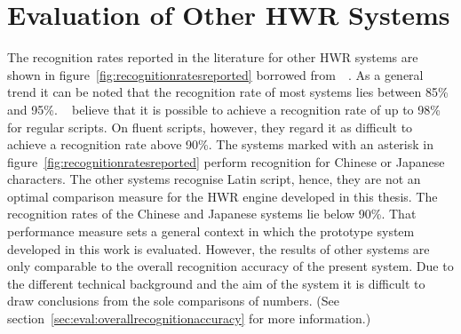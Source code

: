 


\section{Evaluation of Other HWR Systems}
\label{sec:eval:othersystems}

The recognition rates reported in the literature for other HWR systems are 
shown in figure~\ref{fig:recognitionratesreported} borrowed 
from~~\citeyear{LiuJaegerNakagawa2004}.
As a general trend it can be noted that the recognition rate of most systems
lies between 85\% and 95\%. 
~\citeyear{LiuJaegerNakagawa2004}
believe that it is possible to achieve a recognition rate of up to 98\% 
for regular scripts. On fluent scripts, however, they regard it as difficult 
to achieve a recognition rate above 90\%.
The systems marked with an asterisk in figure~\ref{fig:recognitionratesreported}
perform recognition for Chinese or Japanese characters. 
The other systems recognise Latin script, hence, they are not an optimal
comparison measure for the HWR engine developed in this thesis.
The recognition rates of the Chinese and Japanese systems lie below 90\%. 
That performance measure sets a general context in which 
the prototype system developed in this work is evaluated.
However, the results of other systems are only comparable to the overall 
recognition accuracy of the present system. Due to the different technical
background and the aim of the system it is difficult to draw conclusions
from the sole comparisons of numbers. 
(See section~\ref{sec:eval:overallrecognitionaccuracy} for more information.)
